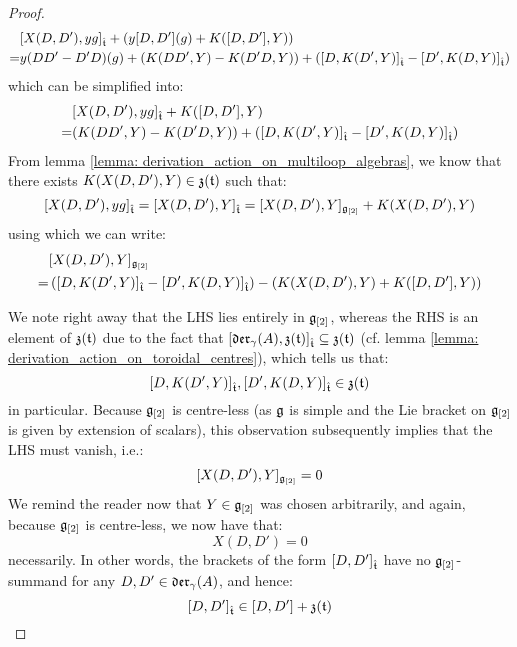 \begin{proof}
                    $$
                        \begin{aligned}
                            & [ X(D, D') , y g ]_{\hat{\mathfrak{t}}} + \left( y [D, D'](g) + K([D, D'], Y) \right)
                            \\
                            = & y (DD' - D'D)( g ) + ( K(DD', Y) - K(D'D, Y) ) + ( [ D, K(D', Y) ]_{\hat{\mathfrak{t}}} - [ D', K(D, Y) ]_{\hat{\mathfrak{t}}} )
                        \end{aligned}
                    $$
                which can be simplified into:
                    $$
                        \begin{aligned}
                            & [ X(D, D') , y g ]_{\hat{\mathfrak{t}}} + K([D, D'], Y)
                            \\
                            = & ( K(DD', Y) - K(D'D, Y) ) + ( [ D, K(D', Y) ]_{\hat{\mathfrak{t}}} - [ D', K(D, Y) ]_{\hat{\mathfrak{t}}} )
                        \end{aligned}
                    $$
                From lemma \ref{lemma: derivation_action_on_multiloop_algebras}, we know that there exists $K( X(D, D'), Y ) \in \mathfrak{z}(\mathfrak{t})$ such that:
                    $$[ X(D, D') , y g ]_{\hat{\mathfrak{t}}} = [ X(D, D') , Y ]_{\hat{\mathfrak{t}}} = [X(D, D'), Y]_{\mathfrak{g}_{[2]}} + K( X(D, D'), Y )$$
                using which we can write:
                    $$
                        \begin{aligned}
                            & [X(D, D'), Y]_{\mathfrak{g}_{[2]}}
                            \\
                            = & \left( [ D, K(D', Y) ]_{\hat{\mathfrak{t}}} - [ D', K(D, Y) ]_{\hat{\mathfrak{t}}} \right) - \left( K( X(D, D'), Y ) + K([D, D'], Y) \right)
                        \end{aligned}
                    $$
                    
                We note right away that the LHS lies entirely in $\mathfrak{g}_{[2]}$, whereas the RHS is an element of $\mathfrak{z}(\mathfrak{t})$ due to the fact that $[\mathfrak{der}_{\gamma}(A), \mathfrak{z}(\mathfrak{t})]_{\hat{\mathfrak{t}}} \subseteq \mathfrak{z}(\mathfrak{t})$ (cf. lemma \ref{lemma: derivation_action_on_toroidal_centres}), which tells us that:
                    $$[ D, K(D', Y) ]_{\hat{\mathfrak{t}}}, [ D', K(D, Y) ]_{\hat{\mathfrak{t}}} \in \mathfrak{z}(\mathfrak{t})$$
                in particular. Because $\mathfrak{g}_{[2]}$ is centre-less (as $\mathfrak{g}$ is simple and the Lie bracket on $\mathfrak{g}_{[2]}$ is given by extension of scalars), this observation subsequently implies that the LHS must vanish, i.e.:
                    $$[X(D, D'), Y]_{\mathfrak{g}_{[2]}} = 0$$
                We remind the reader now that $Y \in \mathfrak{g}_{[2]}$ was chosen arbitrarily, and again, because $\mathfrak{g}_{[2]}$ is centre-less, we now have that:
                    $$X(D, D') = 0$$
                necessarily. In other words, the brackets of the form $[D, D']_{\hat{\mathfrak{t}}}$ have no $\mathfrak{g}_{[2]}$-summand for any $D, D' \in \mathfrak{der}_{\gamma}(A)$, and hence:
                    $$[D, D']_{\hat{\mathfrak{t}}} \in [D, D'] + \mathfrak{z}(\mathfrak{t})$$
            \end{proof}

